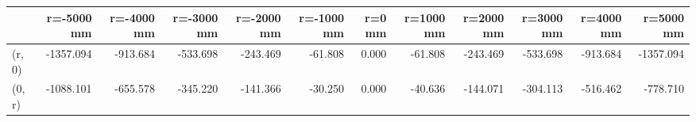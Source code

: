 \documentclass[convert={convertexe={magick.exe}}]{standalone}
\begin{document}
\begin{tabular}{lrrrrrrrrrrr}
\toprule
{} &  r=-5000 mm &  r=-4000 mm &  r=-3000 mm &  r=-2000 mm &  r=-1000 mm &  r=0 mm &  r=1000 mm &  r=2000 mm &  r=3000 mm &  r=4000 mm &  r=5000 mm \\
\midrule
(r, 0) &   -1357.094 &    -913.684 &    -533.698 &    -243.469 &     -61.808 &   0.000 &    -61.808 &   -243.469 &   -533.698 &   -913.684 &  -1357.094 \\
(0, r) &   -1088.101 &    -655.578 &    -345.220 &    -141.366 &     -30.250 &   0.000 &    -40.636 &   -144.071 &   -304.113 &   -516.462 &   -778.710 \\
\bottomrule
\end{tabular}
\end{document}
